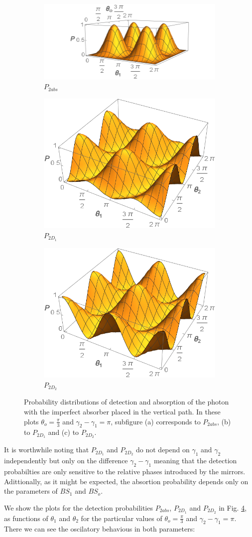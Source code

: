 \documentclass[12pt]{book}
\begin{document}
\begin{figure}[t!]
\centering
\begin{subfigure}[b]{0.45\linewidth}
\includegraphics[width=\linewidth,height=2.8 cm]{images/P1abs.png}
\caption{$P_{2abs}$}
\label{fig:BS2}
\end{subfigure}
\begin{subfigure}[b]{0.45\linewidth}
\includegraphics[width=\linewidth,height=2.8 cm]{images/P1d1.png}
\caption{$P_{2D_{1}}$}
\label{fig:westminster_aerea}
\end{subfigure}
\begin{subfigure}[b]{0.45\linewidth}
\includegraphics[width=\linewidth,height=2.8 cm]{images/P1d2.png}
\caption{$P_{2D_{2}}$}
\label{fig:BS2}
\end{subfigure}
\caption{Probability distributions of detection and absorption of the photon with the imperfect absorber placed in the vertical path. In these plots $\theta_{o}=\frac{\pi}{3}$ and $\gamma_{2}-\gamma_{1}=\pi$, subfigure (a) corresponds to $P_{2abs}$, (b) to $P_{2D_{1}}$ and (c) to $P_{2D_{2}}$.}
\label{P_bs}
\end{figure}
It is worthwhile noting that $P_{2D_{1}}$ and $P_{2D_{2}}$ do not depend on $\gamma_{1}$ and $\gamma_{2}$ independently but only on the difference $\gamma_{2}-\gamma_{1}$ meaning that the detection probabilties are only sensitive to the relative phases introduced by the mirrors. Adittionally, as it might be expected, the absortion probability depends only on the parameters of $BS_{1}$ and $BS_{o}$.

We show the plots for the detection probabilities $P_{2abs}$, $P_{2D_{1}}$ and $P_{2D_{2}}$ in Fig. \ref{P_bs}, as functions of $\theta_{1}$ and $\theta_{2}$ for the particular values of $\theta_{o}=\frac{\pi}{3}$ and $\gamma_{2}-\gamma_{1}=\pi$. There we can see the oscilatory behavious in both parameters:
\end{document}
